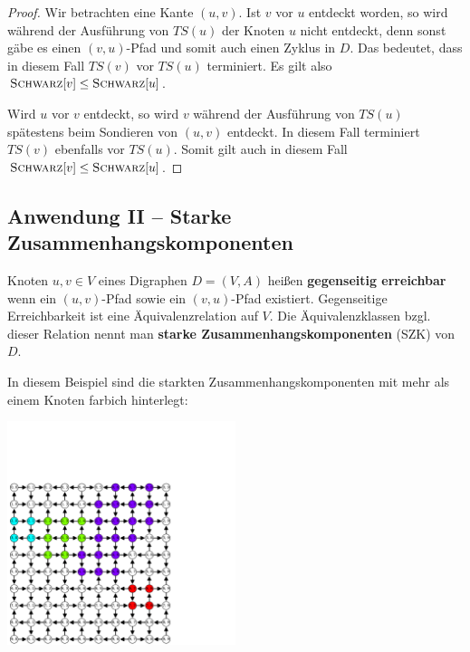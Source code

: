 \begin{proof}
	Wir betrachten eine Kante $(u,v)$. Ist $v$ vor $u$ entdeckt worden, so wird während der Ausführung von $TS(u)$ der Knoten $u$ nicht entdeckt, denn sonst gäbe es einen $(v,u)$-Pfad und somit auch einen Zyklus in $D$. Das bedeutet, dass in diesem Fall $TS(v)$ vor $TS(u)$ terminiert. Es gilt also $\mathop{\text{\textsc{Schwarz}}}[v] \le \mathop{\text{\textsc{Schwarz}}}[u]$. 
	
	Wird $u$ vor $v$ entdeckt, so wird $v$ während der Ausführung von $TS(u)$ spätestens beim Sondieren von $(u,v)$ entdeckt. In diesem Fall terminiert $TS(v)$ ebenfalls vor $TS(u)$. Somit gilt auch in diesem Fall $\mathop{\text{\textsc{Schwarz}}}[v] \le \mathop{\text{\textsc{Schwarz}}}[u]$.
\end{proof}




\subsection{Anwendung II -- Starke Zusammenhangskomponenten}

\begin{defn}
	Knoten $u,v \in V$ eines Digraphen $D=(V,A)$ heißen \textbf{gegenseitig erreichbar} wenn ein $(u,v)$-Pfad sowie ein $(v,u)$-Pfad existiert. Gegenseitige Erreichbarkeit ist eine Äquivalenzrelation auf $V$. Die Äquivalenzklassen bzgl. dieser Relation nennt man \textbf{starke Zusammenhangskomponenten} (SZK) von $D$. 
\end{defn} 

\begin{bsp}
	In diesem Beispiel sind die starkten Zusammenhangskomponenten mit mehr als einem Knoten farbich hinterlegt: 
\begin{center}
	\includegraphics[width=0.5\textwidth]{Code/strongly_connected_comp.pdf}
\end{center} 
\end{bsp}

